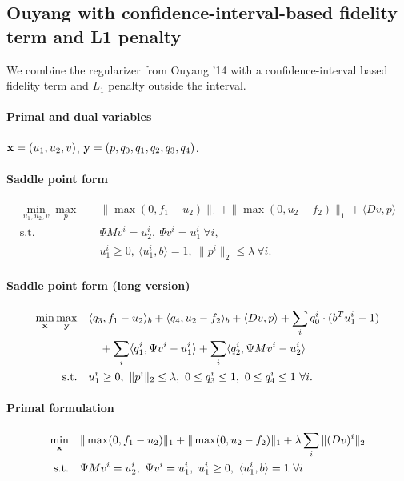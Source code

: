 
\subsection{Ouyang with confidence-interval-based fidelity term and L1 penalty}

We combine the regularizer from Ouyang '14 with a confidence-interval based
fidelity term and $L_1$ penalty outside the interval.

\paragraph{Primal and dual variables}
$\mathbf{x} = (u_1,u_2,v)$, $\mathbf{y} = (p,q_0,q_1,q_2,q_3,q_4)$.

\paragraph{Saddle point form}
\begin{align*}
    \min_{u_1,u_2,v} \max_{p} \quad
        & \|\max(0, f_1 - u_2)\|_1 + \|\max(0, u_2 - f_2)\|_1 + \langle Dv, p \rangle \\
    \text{s.t.}\quad
        & \Psi M v^i = u_2^i, ~\Psi v^i = u_1^i ~\forall i, \\
        & u_1^i \geq 0, ~\langle u_1^i, b \rangle = 1,
          ~\|p^{i}\|_{2} \leq \lambda ~\forall i.
\end{align*}

\paragraph{Saddle point form (long version)}
\begin{align*}
    \min_{\mathbf{x}} \max_{\mathbf{y}} \quad
        & \langle q_3, f_1 - u_2 \rangle_b + \langle q_4, u_2 - f_2 \rangle_b
            + \langle Dv, p \rangle
            + \sum_{i} q_0^i \cdot (b^T u_1^i - 1) \\
        &\quad + \sum_{i} \langle q_1^i, \Psi v^i - u_1^i \rangle
            + \sum_{i} \langle q_2^i, \Psi M v^i - u_2^i \rangle \\
    \text{s.t.}\quad
        & u_1^i \geq 0, ~\|p^{i}\|_{2} \leq \lambda,
          ~0 \leq q_3^i \leq 1, ~0 \leq q_4^i \leq 1 ~\forall i.
\end{align*}

\paragraph{Primal formulation}
\begin{align*}
    \min_{\mathbf{x}} \quad
        & \|\max(0, f_1 - u_2)\|_1 + \|\max(0, u_2 - f_2)\|_1
            + \lambda \sum_{i} \| (D v)^{i} \|_{2} \\
    \text{s.t.}\quad
        & \Psi M v^i = u_2^i, ~\Psi v^i = u_1^i,
          ~u_1^i \geq 0, ~\langle u_1^i, b \rangle = 1 ~\forall i
\end{align*}

